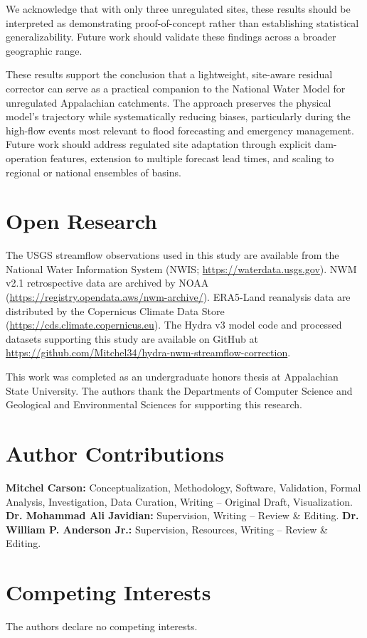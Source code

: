 \documentclass[draft]{agujournal2019}
\begin{document}
We acknowledge that with only three unregulated sites, these results should be interpreted as demonstrating proof-of-concept rather than establishing statistical generalizability. Future work should validate these findings across a broader geographic range.

These results support the conclusion that a lightweight, site-aware residual corrector can serve as a practical companion to the National Water Model for unregulated Appalachian catchments. The approach preserves the physical model's trajectory while systematically reducing biases, particularly during the high-flow events most relevant to flood forecasting and emergency management. Future work should address regulated site adaptation through explicit dam-operation features, extension to multiple forecast lead times, and scaling to regional or national ensembles of basins.


\section*{Open Research}
The USGS streamflow observations used in this study are available from the National Water Information System (NWIS; \url{https://waterdata.usgs.gov}). NWM v2.1 retrospective data are archived by NOAA (\url{https://registry.opendata.aws/nwm-archive/}). ERA5-Land reanalysis data are distributed by the Copernicus Climate Data Store (\url{https://cds.climate.copernicus.eu}). The Hydra v3 model code and processed datasets supporting this study are available on GitHub at \url{https://github.com/Mitchel34/hydra-nwm-streamflow-correction}.


\acknowledgments
This work was completed as an undergraduate honors thesis at Appalachian State University. The authors thank the Departments of Computer Science and Geological and Environmental Sciences for supporting this research.

\section*{Author Contributions}
\textbf{Mitchel Carson:} Conceptualization, Methodology, Software, Validation, Formal Analysis, Investigation, Data Curation, Writing -- Original Draft, Visualization. \textbf{Dr. Mohammad Ali Javidian:} Supervision, Writing -- Review \& Editing. \textbf{Dr. William P. Anderson Jr.:} Supervision, Resources, Writing -- Review \& Editing.

\section*{Competing Interests}
The authors declare no competing interests.



\end{document}
